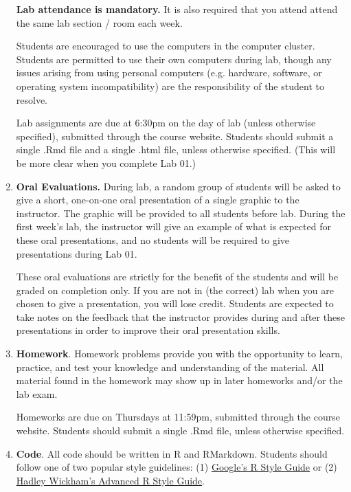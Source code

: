 \documentclass[11pt]{article}
\begin{document}
\begin{enumerate}
\textbf{Lab attendance is mandatory.}  It is also required that you attend attend the same lab section / room each week.

Students are encouraged to use the computers in the computer cluster.  Students are permitted to use their own computers during lab, though any issues arising from using personal computers (e.g. hardware, software, or operating system incompatibility) are the responsibility of the student to resolve.

Lab assignments are due at 6:30pm on the day of lab (unless otherwise specified), submitted through the course website.  Students should submit a single .Rmd file and a single .html file, unless otherwise specified.  (This will be more clear when you complete Lab 01.)

\item {\bf Oral Evaluations.} During lab, a random group of students will be asked to give a short, one-on-one oral presentation of a single graphic to the instructor.  The graphic will be provided to all students before lab.  During the first week's lab, the instructor will give an example of what is expected for these oral presentations, and no students will be required to give presentations during Lab 01.

These oral evaluations are strictly for the benefit of the students and will be graded on completion only.  If you are not in (the correct) lab when you are chosen to give a presentation, you will lose credit.  Students are expected to take notes on the feedback that the instructor provides during and after these presentations in order to improve their oral presentation skills.

\item {\bf Homework}. 
Homework problems provide you with the opportunity to learn, practice, and test your knowledge and understanding of the material.  All material found in the homework may show up in later homeworks and/or the lab exam.

Homeworks are due on Thursdays at 11:59pm, submitted through the course website.  Students should submit a single .Rmd file, unless otherwise specified.

\item {\bf Code}.  All code should be written in R and RMarkdown.  Students should follow one of two popular style guidelines:  (1) \href{https://google.github.io/styleguide/Rguide.xml}{Google's R Style Guide} or (2) \href{http://adv-r.had.co.nz/Style.html}{Hadley Wickham's Advanced R Style Guide}.


\end{enumerate}
\end{document}
